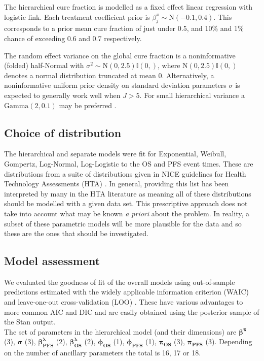\documentclass[AMA,STIX1COL]{WileyNJD-v2}
\begin{document}
The hierarchical cure fraction is modelled as a fixed effect linear regression with logistic link. Each treatment coefficient prior is $\beta^{\pi}_j \sim \text{N}(-0.1, 0.4)$.
This corresponds to a prior mean cure fraction of just under 0.5, and 10\% and 1\% chance of exceeding 0.6 and 0.7 respectively.  

The random effect variance on the global cure fraction is a noninformative (folded) half-Normal \cite{Gelman2006} with 
${\sigma^2 \sim \text{N}(0, 2.5)\mathbb{I}(0,)}$, where $\text{N}(0, 2.5)\mathbb{I}(0,)$ denotes a normal distribution truncated at mean 0.
Alternatively, a noninformative uniform prior density on standard deviation parameters $\sigma$ is expected to generally work well when $J > 5$.
For small hierarchical variance a $\text{Gamma}(2, 0.1)$ may be preferred \cite{Chung2013}.

%
\subsection{Choice of distribution}
The hierarchical and separate models were fit for Exponential, Weibull, Gompertz, Log-Normal, Log-Logistic to the OS and PFS event times.
These are distributions from a suite of distributions given in NICE guidelines for Health Technology Assessments (HTA) \cite{Latimer2011}.
In general, providing this list has been interpreted by many in the HTA literature as meaning all of these distributions should be modelled with a given data set.
This prescriptive approach does not take into account what may be known {\it a priori} about the problem.
In reality, a subset of these parametric models will be more plausible for the data and so these are the ones that should be investigated.

%
\subsection{Model assessment}
We evaluated the goodness of fit of the overall models using out-of-sample predictions estimated with the widely applicable information criterion (WAIC) and leave-one-out cross-validation (LOO) \cite{Vehtari2017}.
These have various advantages to more common AIC and DIC and are easily obtained using the posterior sample of the Stan output.\\
The set of parameters in the hierarchical model (and their dimensions) are
$\mathbf{\beta^{\pi}}$ (3), $\mathbf{\sigma}$ (3), $\mathbf{\beta^{\lambda}_{PFS}}$ (2), $\mathbf{\beta^{\lambda}_{OS}}$ (2), $\mathbf{\phi_{OS}}$ (1), $\mathbf{\phi_{PFS}}$ (1), $\mathbf{\pi_{OS}}$ (3), $\mathbf{\pi_{PFS}}$ (3).
Depending on the number of ancillary parameters the total is 16, 17 or 18.
\end{document}
